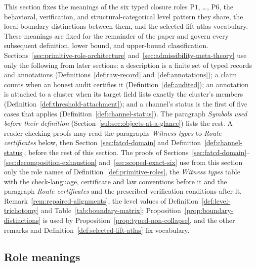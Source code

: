 \documentclass[11pt]{article}
\theoremstyle{definition}
\newcommand{\Pone}{\ensuremath{\mathrm{P1}}}
\newcommand{\Psix}{\ensuremath{\mathrm{P6}}}
\begin{document}
This section fixes the meanings of the six typed closure roles
\Pone{}, \ldots, \Psix{}, the behavioral, verification, and
structural-categorical level pattern they share, the local boundary
distinctions between them, and the selected-lift atlas vocabulary.
These meanings are fixed for the remainder of the paper and govern
every subsequent definition, lower bound, and upper-bound
classification. Sections~\ref{sec:primitive-role-architecture}
and~\ref{sec:admissibility-meta-theory} use only the following from later
sections: a description is a finite set of typed records and annotations
(Definitions~\ref{def:raw-record} and~\ref{def:annotations}); a claim counts
when an honest audit certifies it (Definition~\ref{def:audited}); an
annotation is attached to a cluster when its target field lists exactly the
cluster's members (Definition~\ref{def:threshold-attachment}); and a channel's
status is the first of five cases that applies
(Definition~\ref{def:channel-status}). The paragraph \emph{Symbols used before
their definition} (Section~\ref{subsec:objects-at-a-glance}) lists the rest. A reader checking
proofs may read the paragraphs \emph{Witness types} to \emph{Route
certificates} below, then Section~\ref{sec:fatcd-domain} and
Definition~\ref{def:channel-status}, before the rest of this section.
The proofs of Sections~\ref{sec:fatcd-domain}--\ref{sec:decomposition-exhaustion}
and~\ref{sec:scoped-exact-six} use from this section only the role names of
Definition~\ref{def:primitive-roles}, the \emph{Witness types} table with the
check-language, certificate and law conventions before it and the paragraph
\emph{Route certificates} and the prescribed verification conditions after it,
Remark~\ref{rem:repaired-alignments}, the level values of
Definition~\ref{def:level-trichotomy} and Table~\ref{tab:boundary-matrix};
Proposition~\ref{prop:boundary-distinctions} is used by
Proposition~\ref{prop:typed-non-collapse}, and the other remarks and
Definition~\ref{def:selected-lift-atlas} fix vocabulary.

\subsection{Role meanings}\label{subsec:role-meanings}
\end{document}
